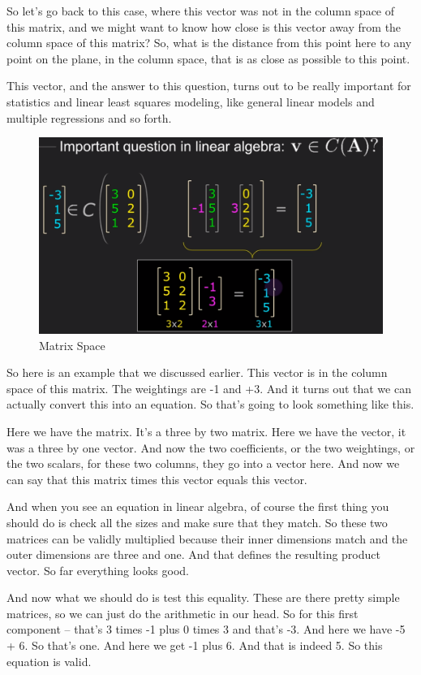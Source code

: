 \documentclass[fleqn,10pt]{olplainarticle}
\theoremstyle{definition}
\theoremstyle{remark}
\begin{document}
So let's go back to this case, where this vector was not in the column space of this matrix, and we might want to know how close is this vector away from the column space of this matrix? So, what is the distance from this point here to any point on the plane, in the column space, that is as close as possible to this point.

This vector, and the answer to this question, turns out to be really important for statistics and linear least squares modeling, like general linear models and multiple regressions and so forth.

\begin{figure}[ht]
	\centering
	\includegraphics[width=0.5\linewidth]{images/matrix-space-08.png}
	\caption{Matrix Space}
	\label{fig:matrix_space_08}
\end{figure}

So here is an example that we discussed earlier. This vector is in the column space of this matrix. The weightings are -1 and +3. And it turns out that we can actually convert this into an equation. So that's going to look something like this.

Here we have the matrix. It's a three by two matrix. Here we have the vector, it was a three by one vector. And now the two coefficients, or the two weightings, or the two scalars, for these two columns, they go into a vector here. And now we can say that this matrix times this vector equals this vector.

And when you see an equation in linear algebra, of course the first thing you should do is check all the sizes and make sure that they match. So these two matrices can be validly multiplied because their inner dimensions match and the outer dimensions are three and one. And that defines the resulting product vector. So far everything looks good.

And now what we should do is test this equality. These are there pretty simple matrices, so we can just do the arithmetic in our head. So for this first component -- that's 3 times -1 plus 0 times 3 and that's -3. And here we have -5 + 6. So that's one. And here we get -1 plus 6. And that is indeed 5. So this equation is valid. 
\end{document}

